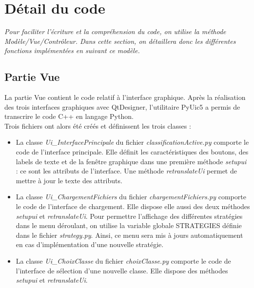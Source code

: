 \chapter[Détail du code]{Détail du code}

\textit{Pour faciliter l'écriture et la compréhension du code, on utilise la méthode Modèle/Vue/Contrôleur. Dans cette section, on détaillera donc les différentes fonctions implémentées en suivant ce modèle.}

\section{Partie Vue}

La partie Vue contient le code relatif à l'interface graphique. Après la réalisation des trois interfaces graphiques avec QtDesigner, l'utilitaire PyUic5 a permis de transcrire le code C++ en langage Python. \\

\noindent Trois fichiers ont alors été créés et définissent les trois classes :
\begin{itemize}[label=$\rightarrow$]
	\item La classe \textit{Ui\_InterfacePrincipale} du fichier \textit{classificationActive.py} comporte le code de l'interface principale. Elle définit les caractéristiques des boutons, des labels de texte et de la fenêtre graphique dans une première méthode \textit{setupui} : ce sont les attributs de l'interface. Une méthode \textit{retranslateUi} permet de mettre à jour le texte des attributs.\\
	\item La classe \textit{Ui\_ChargementFichiers} du fichier \textit{chargementFichiers.py} comporte le code de l'interface de chargement. Elle dispose elle aussi des deux méthodes \textit{setupui} et \textit{retranslateUi}. Pour permettre l'affichage des différentes stratégies dans le menu déroulant, on utilise la variable globale STRATEGIES définie dans le fichier \textit{strategy.py}. Ainsi, ce menu sera mis à jours automatiquement en cas d'implémentation d'une nouvelle stratégie.\\
	\item La classe \textit{Ui\_ChoixClasse} du fichier \textit{choixClasse.py} comporte le code de l'interface de sélection d'une nouvelle classe. Elle dispose des méthodes \textit{setupui} et \textit{retranslateUi}.\\
\end{itemize}

